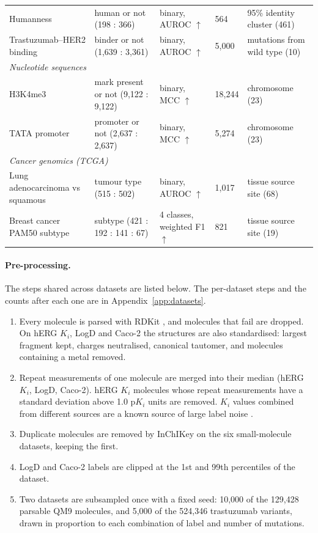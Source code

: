 \begin{table}[htbp]
\begin{tabular}{p{3.0cm}p{3.3cm}p{2.3cm}p{1.1cm}p{3.5cm}}
Humanness \citep{Prihoda2022} & human or not (198 : 366) & binary, AUROC $\uparrow$ & 564 & 95\% identity cluster (461) \\
Trastuzumab--HER2 binding \citep{Chinery2024} & binder or not (1,639 : 3,361) & binary, AUROC $\uparrow$ & 5,000 & mutations from wild type (10) \\
\midrule
\multicolumn{5}{l}{\textit{Nucleotide sequences}} \\
H3K4me3 \citep{DallaTorre2025} & mark present or not (9,122 : 9,122) & binary, MCC $\uparrow$ & 18,244 & chromosome (23) \\
TATA promoter \citep{DallaTorre2025} & promoter or not (2,637 : 2,637) & binary, MCC $\uparrow$ & 5,274 & chromosome (23) \\
\midrule
\multicolumn{5}{l}{\textit{Cancer genomics (TCGA)}} \\
Lung adenocarcinoma vs squamous \citep{TCGA2014LUAD, TCGA2012LUSC, Goldman2020} & tumour type (515 : 502) & binary, AUROC $\uparrow$ & 1,017 & tissue source site (68) \\
Breast cancer PAM50 subtype \citep{TCGA2012BRCA, Parker2009, Goldman2020} & subtype (421 : 192 : 141 : 67) & 4 classes, weighted F1 $\uparrow$ & 821 & tissue source site (19) \\
\bottomrule
\end{tabular}
\end{table}

\paragraph{Pre-processing.} The steps shared across datasets are listed below. The per-dataset steps and the counts after each one are in Appendix~\ref{app:datasets}.
\begin{enumerate}[leftmargin=*]
    \item Every molecule is parsed with RDKit \citep{rdkit}, and molecules that fail are dropped. On hERG $K_i$, LogD and Caco-2 the structures are also standardised: largest fragment kept, charges neutralised, canonical tautomer, and molecules containing a metal removed.
    \item Repeat measurements of one molecule are merged into their median (hERG $K_i$, LogD, Caco-2). hERG $K_i$ molecules whose repeat measurements have a standard deviation above 1.0 p$K_i$ units are removed. $K_i$ values combined from different sources are a known source of large label noise \citep{landrum2024}.
    \item Duplicate molecules are removed by InChIKey on the six small-molecule datasets, keeping the first.
    \item LogD and Caco-2 labels are clipped at the 1st and 99th percentiles of the dataset.
    \item Two datasets are subsampled once with a fixed seed: 10,000 of the 129,428 parsable QM9 molecules, and 5,000 of the 524,346 trastuzumab variants, drawn in proportion to each combination of label and number of mutations.
\end{enumerate}

